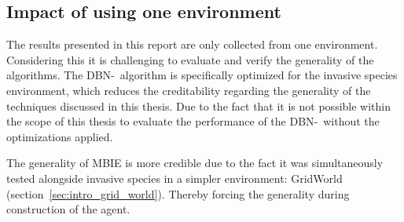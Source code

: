 \subsection{Impact of using one environment}
\label{sec:impact_of_one_env}

The results presented in this report are only collected from one environment.
Considering this it is challenging to evaluate and verify the generality of the
algorithms. The DBN-\etre\ algorithm is specifically optimized for the invasive species
environment, which reduces the creditability regarding the generality of the
techniques discussed in this thesis. Due to the fact that it is not possible
within the scope of this thesis to evaluate the performance of the DBN-\etre\,
without the optimizations applied. 

The generality of MBIE is more credible due to the fact it was simultaneously
tested alongside invasive species in a simpler environment: GridWorld
(section~\ref{sec:intro_grid_world}). Thereby forcing the generality during
construction of the agent.
